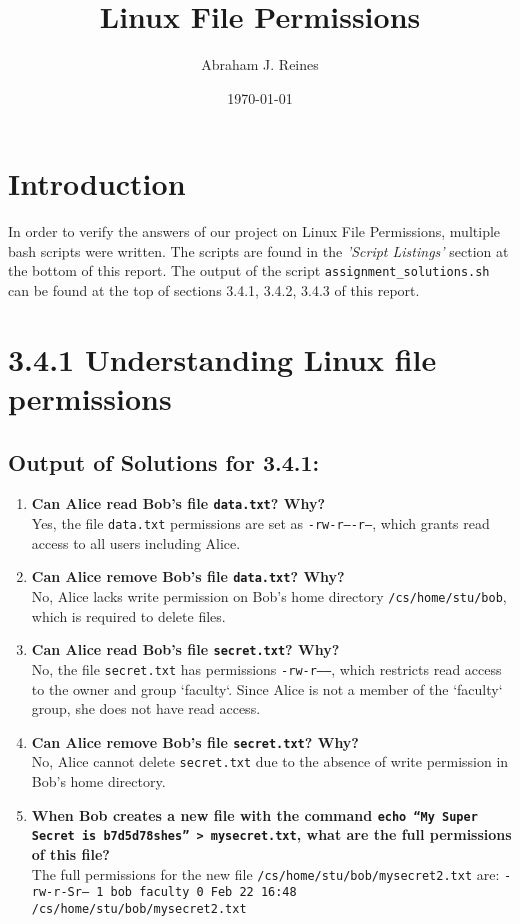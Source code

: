 \documentclass{article}
\title{Linux File Permissions}
\author{Abraham J. Reines}
\date{\today}
\begin{document}
\maketitle

\section*{Introduction}
In order to verify the answers of our project on Linux File Permissions, multiple bash scripts were written. The scripts are found in the \textit{'Script Listings'} section at the bottom of this report. The output of the script \texttt{assignment\_solutions.sh} can be found at the top of sections 3.4.1, 3.4.2, 3.4.3 of this report. 

\section*{3.4.1 Understanding Linux file permissions}

\subsection*{Output of Solutions for 3.4.1:}


\begin{enumerate}
    \item \textbf{Can Alice read Bob's file \texttt{data.txt}? Why?}\\
    Yes, the file \texttt{data.txt} permissions are set as \texttt{-rw-r----r--}, which grants read access to all users including Alice.
    
    \item \textbf{Can Alice remove Bob's file \texttt{data.txt}? Why?}\\
    No, Alice lacks write permission on Bob's home directory \texttt{/cs/home/stu/bob}, which is required to delete files.
    
    \item \textbf{Can Alice read Bob's file \texttt{secret.txt}? Why?}\\
    No, the file \texttt{secret.txt} has permissions \texttt{-rw-r-----}, which restricts read access to the owner and group `faculty`. Since Alice is not a member of the `faculty` group, she does not have read access.
    
    \item \textbf{Can Alice remove Bob's file \texttt{secret.txt}? Why?}\\
    No, Alice cannot delete \texttt{secret.txt} due to the absence of write permission in Bob's home directory.
    
    \item \textbf{When Bob creates a new file with the command \texttt{echo “My Super Secret is b7d5d78shes” > mysecret.txt}, what are the full permissions of this file?}\\
The full permissions for the new file \texttt{/cs/home/stu/bob/mysecret2.txt} are: \texttt{-rw-r-Sr-- 1 bob faculty 0 Feb 22 16:48 /cs/home/stu/bob/mysecret2.txt}
\end{enumerate}
\end{document}
